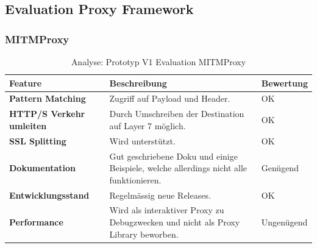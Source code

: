 \subsection{Evaluation Proxy Framework}
\label{analyse:proxyframework}


\begin{table}[H]
	\subsubsection{MITMProxy}
    \centering
	\begin{tabularx}{\textwidth}{| l | X | X |}
        \hline
        \textbf{Feature} & \textbf{Beschreibung} & \textbf{Bewertung} \\ \hline
        \textbf{Pattern Matching} & Zugriff auf Payload und Header. & \cellcolor{green!25}OK \\ \hline 
        \textbf{HTTP/S Verkehr umleiten} & Durch Umschreiben der Destination auf Layer 7 möglich.  & \cellcolor{green!25}OK \\ \hline 
        \textbf{SSL Splitting} & Wird unterstützt. & \cellcolor{green!25}OK \\ \hline 
        \textbf{Dokumentation} & Gut geschriebene Doku und einige Beispiele, welche allerdings nicht alle funktionieren. & \cellcolor{yellow!25}Genügend \\ \hline  
        \textbf{Entwicklungsstand} & Regelmässig neue Releases. & \cellcolor{green!25}OK \\ \hline
        \textbf{Performance} & Wird als interaktiver Proxy zu Debugzwecken und nicht als Proxy Library beworben. & \cellcolor{red!25}Ungenügend \\ \hline       
    \end{tabularx}
    \caption{Analyse: Prototyp V1 Evaluation MITMProxy}
\end{table}


